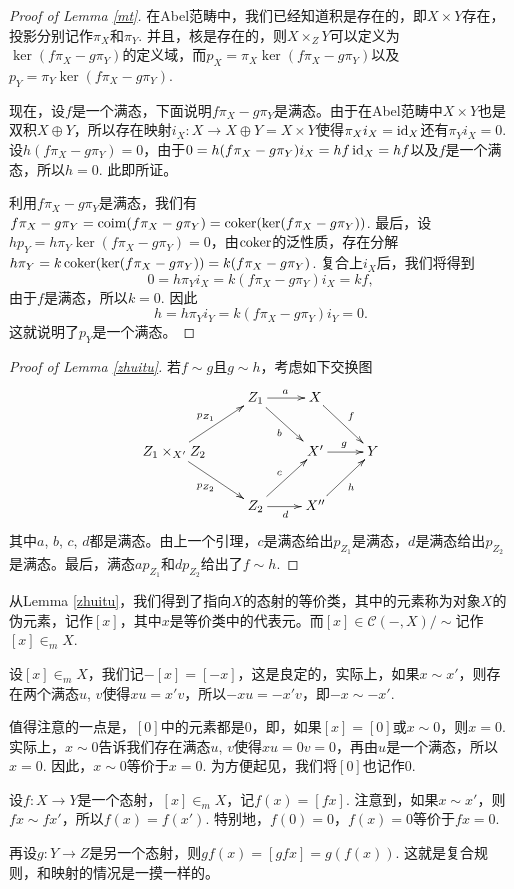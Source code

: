 \begin{proof}[Proof of Lemma \ref{mt}]
	在Abel范畴中，我们已经知道积是存在的，即$X\times Y$存在，投影分别记作$\pi_X$和$\pi_Y$. 并且，核是存在的，则$X\times_Z Y$可以定义为$\ker(f\pi_X-g\pi_Y)$的定义域，而$p_X=\pi_X\ker(f\pi_X-g\pi_Y)$以及$p_Y=\pi_Y\ker(f\pi_X-g\pi_Y)$.

	现在，设$f$是一个满态，下面说明$f\pi_X-g\pi_Y$是满态。由于在Abel范畴中$X\times Y$也是双积$X\oplus Y$，所以存在映射$i_X:X\to X\oplus Y=X\times Y$使得$\pi_Xi_X=\operatorname{id}_X$还有$\pi_Yi_X=0$. 设$h(f\pi_X-g\pi_Y)=0$，由于$0=h(f\pi_X-g\pi_Y)i_X=hf\operatorname{id}_X=hf$以及$f$是一个满态，所以$h=0$. 此即所证。

	利用$f\pi_X-g\pi_Y$是满态，我们有$f\pi_X-g\pi_Y=\operatorname{coim}(f\pi_X-g\pi_Y)=\operatorname{coker}(\ker(f\pi_X-g\pi_Y))$. 最后，设$hp_Y=h\pi_Y\ker(f\pi_X-g\pi_Y)=0$，由$\operatorname{coker}$的泛性质，存在分解$h\pi_Y=k\operatorname{coker}(\ker(f\pi_X-g\pi_Y))=k(f\pi_X-g\pi_Y)$. 复合上$i_X$后，我们将得到
	\[
	0=h\pi_Yi_X=k(f\pi_X-g\pi_Y)i_X=kf,
	\]
	由于$f$是满态，所以$k=0$. 因此
	\[
	h=h\pi_Yi_Y=k(f\pi_X-g\pi_Y)i_Y=0.
	\]
	这就说明了$p_Y$是一个满态。
\end{proof}

\begin{proof}[Proof of Lemma \ref{zhuitu}]
	若$f\sim g$且$g\sim h$，考虑如下交换图
	\[
	\xymatrix{
	&Z_1\ar[r]^a\ar[rd]_b&X\ar[rd]^f&\\
	Z_1\times_{X'} Z_2\ar[ru]^{p_{Z_1}}\ar[rd]_{p_{Z_2}}&&X'\ar[r]^g&Y\\
	&Z_2\ar[ru]^c\ar[r]_d&X''\ar[ru]_h&
	}
	\]
	其中$a$, $b$, $c$, $d$都是满态。由上一个引理，$c$是满态给出$p_{Z_1}$是满态，$d$是满态给出$p_{Z_2}$是满态。最后，满态$ap_{Z_1}$和$dp_{Z_2}$给出了$f\sim h$.
\end{proof}

\begin{para}
从Lemma \ref{zhuitu}，我们得到了指向$X$的态射的等价类，其中的元素称为对象$X$的伪元素，记作$[x]$，其中$x$是等价类中的代表元。而$[x]\in \mathcal{C}(-,X)/\sim$记作$[x]\in_m X$. 

设$[x]\in_m X$，我们记$-[x]=[-x]$，这是良定的，实际上，如果$x\sim x'$，则存在两个满态$u$, $v$使得$xu=x'v$，所以$-xu=-x'v$，即$-x\sim -x'$. 

值得注意的一点是，$[0]$中的元素都是$0$，即，如果$[x]=[0]$或$x\sim 0$，则$x=0$. 实际上，$x\sim 0$告诉我们存在满态$u$, $v$使得$xu=0v=0$，再由$u$是一个满态，所以$x=0$. 因此，$x\sim 0$等价于$x=0$. 为方便起见，我们将$[0]$也记作$0$.

设$f:X\to Y$是一个态射，$[x]\in_m X$，记$f(x)=[fx]$. 注意到，如果$x\sim x'$，则$fx\sim fx'$，所以$f(x)=f(x')$. 特别地，$f(0)=0$，$f(x)=0$等价于$fx=0$.

再设$g:Y\to Z$是另一个态射，则$gf(x)=[gfx]=g(f(x))$. 这就是复合规则，和映射的情况是一摸一样的。
\end{para}

